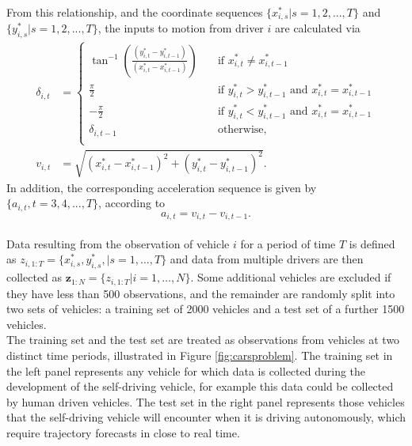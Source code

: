 \documentclass[
12pt, %
onehalfspacing, %
nohyperref, %
headsepline, %
chapterinoneline, %
]{MastersDoctoralThesis} %
\begin{document}
From this relationship, and the coordinate sequences $\{x^*_{i, s} | s=1,2,...,T\}$ and $\{y^*_{i, s} | s=1,2,...,T\}$, the inputs to motion from driver $i$ are calculated via
\begin{align}
\delta_{i, t} &= 
     \begin{cases}
       \tan^{-1}\left(\frac{(y^*_{i, t} - y^*_{i, t-1})}{(x^*_{i, t} - x^*_{i, t-1})} \right)  &\quad\text{if }x^*_{i, t} \neq x^*_{i, t-1} \\
       \frac{\pi}{2} &\quad\text{if } y^*_{i, t} > y^*_{i, t-1} \mbox{ and } x^*_{i, t} = x^*_{i, t-1} \\
       -\frac{\pi}{2} &\quad\text{if } y^*_{i, t} < y^*_{i, t-1} \mbox{ and } x^*_{i, t} = x^*_{i, t-1} \\
       \delta_{i, t-1} &\quad\text{otherwise,} \\ 
     \end{cases} \label{cars:dEq} \\
v_{i, t} &= \sqrt{(x^*_{i, t} - x^*_{i, t-1})^2 + (y^*_{i, t} - y^*_{i, t-1})^2} \label{cars:vEq}.
\end{align}
In addition, the corresponding acceleration sequence is given by $\{a_{i, t},t=3,4,...,T\}$, according to
\begin{equation}
\label{cars:aEq}
a_{i, t} = v_{i, t} - v_{i, t-1}. 
\end{equation}
\\

Data resulting from the observation of vehicle $i$ for a period of time $T$ is defined as $z_{i, 1:T} = \{x^*_{i, s}, y^*_{i, s}, | s = 1, \ldots, T\}$ and data from multiple drivers are then collected as $\mathbf{z}_{1:N} = \{z_{i, 1:T} | i = 1, \ldots, N\}$. Some additional vehicles are excluded if they have less than 500 observations, and the remainder are randomly split into two sets of vehicles: a training set of 2000 vehicles and a test set of a further 1500 vehicles.
\\

The training set and the test set are treated as observations from vehicles at two distinct time periods, illustrated in Figure \ref{fig:carsproblem}. The training set in the left panel represents any vehicle for which data is collected during the development of the self-driving vehicle, for example this data could be collected by human driven vehicles. The test set in the right panel represents those vehicles that the self-driving vehicle will encounter when it is driving autonomously, which require trajectory forecasts in close to real time.
\end{document}
